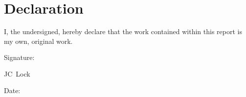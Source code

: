 \chapter{Declaration}

I, the undersigned, hereby declare that the work contained within this report
is my own, original work.\par
\vspace{1.5cm}

\noindent%
\parbox{.5\textwidth}{%
  Signature:\quad\dotfill\par
  \hfill JC\ Lock\hspace{1.8cm}\null}\vspace{1cm}
\newline

\vspace{1.5cm}
\noindent%
\parbox{.5\textwidth}{%
  Date:\quad\dotfill\par}
